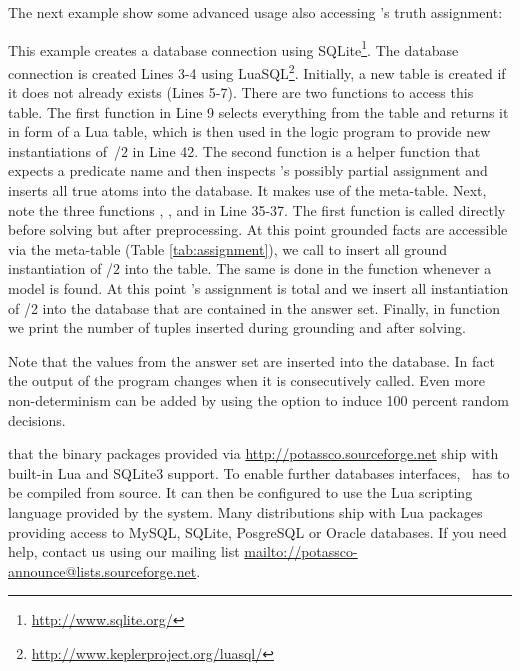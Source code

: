 \begin{example}
The next example show some advanced usage also accessing \clasp's truth assignment:

This example creates a database connection using SQLite\footnote{\url{http://www.sqlite.org/}}.
The database connection is created Lines 3-4 using LuaSQL\footnote{\url{http://www.keplerproject.org/luasql/}}.
Initially, a new table  is created if it does not already exists (Lines 5-7).
There are two functions to access this table.
The first function  in Line 9 selects everything from the table and 
returns it in form of a Lua table, which is then used in the logic program
to provide new instantiations of~/$2$ in Line 42.
The second function  is a helper function that expects a predicate name
and then inspects \clingo's possibly partial assignment and
inserts all true atoms into the database.
It makes use of the  meta-table.
Next, note the three functions
,
, and
in Line 35-37.
The first function is called directly before solving but after preprocessing.
At this point grounded facts are accessible via the  meta-table (Table \ref{tab:assignment}),
we call  to insert all ground instantiation of /$2$ into the  table.
The same is done in the  function whenever a model is found.
At this point \clingo's assignment is total and 
we insert all instantiation of /2 into the database that are contained in the answer set.
Finally, in function  we print the number of tuples inserted during grounding and after solving.

Note that the values from the answer set are inserted into the database.
In fact the output of the program changes when it is consecutively called.
Even more non-determinism can be added by using the option 
to induce 100 percent random decisions.
\eexample
\end{example}

\begin{note}
	that the binary packages provided via \url{http://potassco.sourceforge.net} ship with built-in Lua and SQLite3 support.
	To enable further databases interfaces,	\gringo\ has to be compiled from source. 
	It can then be configured to use the Lua scripting language provided by the system. 
	Many distributions ship with Lua packages providing access to MySQL, SQLite, PosgreSQL or Oracle databases.
	If you need help, contact us using our mailing list \url{mailto://potassco-announce@lists.sourceforge.net}.
\end{note}




